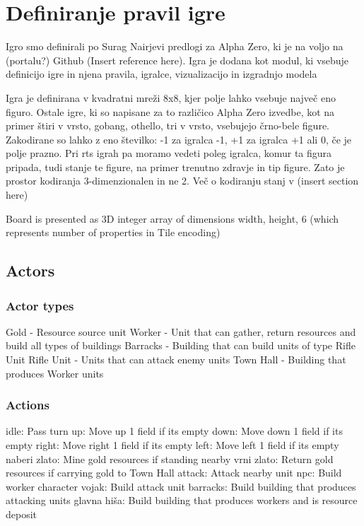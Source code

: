 \documentclass[a4paper, 12pt]{book}
\begin{document}
\chapter{Definiranje pravil igre}
\label{chpravilaigre}

Igro smo definirali po Surag Nairjevi predlogi za Alpha Zero, ki je na voljo na (portalu?) Github (Insert reference here).
Igra je dodana kot modul, ki vsebuje definicijo igre in njena pravila, igralce, vizualizacijo in izgradnjo modela




Igra je definirana v kvadratni mreži 8x8, kjer polje lahko vsebuje največ eno figuro.
Ostale igre, ki so napisane za to različico Alpha Zero izvedbe, kot na primer štiri v vrsto, gobang, othello, tri v vrsto, vsebujejo črno-bele figure.
Zakodirane so lahko z eno številko: -1 za igralca -1, +1 za igralca +1 ali 0, če je polje prazno.
Pri rts igrah pa moramo vedeti poleg igralca, komur ta figura pripada, tudi stanje te figure, na primer trenutno zdravje in tip figure.
Zato je prostor kodiranja 3-dimenzionalen in ne 2. Več o kodiranju stanj v (insert section here)

Board is presented as 3D integer array of dimensions width, height, 6 (which represents number of properties in Tile encoding)

\section{Actors}
\subsection{Actor types}


Gold - Resource source unit
Worker - Unit that can gather, return resources and build all types of buildings
Barracks - Building that can build units of type Rifle Unit
Rifle Unit - Units that can attack enemy units
Town Hall - Building that produces Worker units

\subsection{Actions}

idle: Pass turn
up: Move up 1 field if its empty
down: Move down 1 field if its empty
right: Move right 1 field if its empty
left: Move left 1 field if its empty
naberi zlato: Mine gold resources if standing nearby
vrni zlato: Return gold resources if carrying gold to Town Hall
attack: Attack nearby unit
npc: Build worker character
vojak: Build attack unit
barracks: Build building that produces attacking units
glavna hiša: Build building that produces workers and is resource deposit
\end{document}
